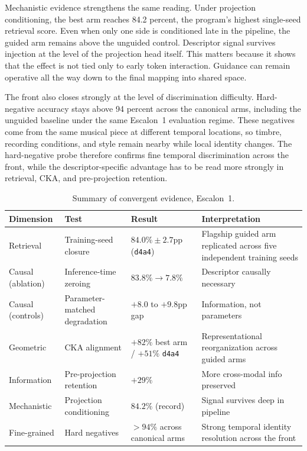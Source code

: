 Mechanistic evidence strengthens the same reading. Under projection conditioning, the best arm reaches 84.2 percent, the program's highest single-seed retrieval score. Even when only one side is conditioned late in the pipeline, the guided arm remains above the unguided control. Descriptor signal survives injection at the level of the projection head itself. This matters because it shows that the effect is not tied only to early token interaction. Guidance can remain operative all the way down to the final mapping into shared space.

The front also closes strongly at the level of discrimination difficulty. Hard-negative accuracy stays above 94 percent across the canonical arms, including the unguided baseline under the same Escalon~1 evaluation regime. These negatives come from the same musical piece at different temporal locations, so timbre, recording conditions, and style remain nearby while local identity changes. The hard-negative probe therefore confirms fine temporal discrimination across the front, while the descriptor-specific advantage has to be read more strongly in retrieval, CKA, and pre-projection retention.

\begin{table}[ht]
\centering
\caption{Summary of convergent evidence, Escalon~1.}
\label{tab:escalon1_evidence}
\footnotesize
\begin{tabularx}{\textwidth}{@{}P{0.16\textwidth}P{0.19\textwidth}P{0.18\textwidth}Y@{}}
\toprule
Dimension & Test & Result & Interpretation \\
\midrule
Retrieval & Training-seed closure & $84.0\% \pm 2.7$pp (\texttt{d4a4}) & Flagship guided arm replicated across five independent training seeds \\
Causal (ablation) & Inference-time zeroing & $83.8\% \to 7.8\%$ & Descriptor causally necessary \\
Causal (controls) & Parameter-matched degradation & $+8.0$ to $+9.8$pp gap & Information, not parameters \\
Geometric & CKA alignment & $+82\%$ best arm / $+51\%$ \texttt{d4a4} & Representational reorganization across guided arms \\
Information & Pre-projection retention & $+29\%$ & More cross-modal info preserved \\
Mechanistic & Projection conditioning & $84.2\%$ (record) & Signal survives deep in pipeline \\
Fine-grained & Hard negatives & $> 94\%$ across canonical arms & Strong temporal identity resolution across the front \\
\bottomrule
\end{tabularx}
\end{table}

